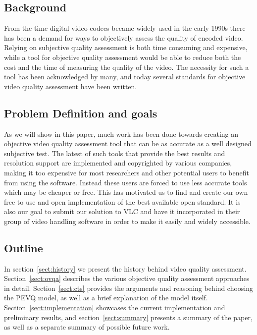 \subsection{Background}\label{sect:background}
From the time digital video codecs became widely used in the early 1990s there has been a demand for ways to objectively assess the quality of encoded video. Relying on subjective quality assessment is both time consuming and expensive, while a tool for objective quality assessment would be able to reduce both the cost and the time of measuring the quality of the video. The necessity for such a tool has been acknowledged by many, and today several standards for objective video quality assessment have been written.


\subsection{Problem Definition and goals}\label{sect:problem}
As we will show in this paper, much work has been done towards creating an objective video quality assessment tool that can be as accurate as a well designed subjective test. The latest of such tools that provide the best results and resolution support are implemented and copyrighted by various companies, making it too expensive for most researchers and other potential users to benefit from using the software. Instead these users are forced to use less accurate tools which may be cheaper or free. This has motivated us to find and create our own free to use and open implementation of the best available open standard. It is also our goal to submit our solution to VLC\cite{vlc} and have it incorporated in their group of video handling software in order to make it easily and widely accessible.


\subsection{Outline}\label{sect:outline}
In section~\ref{sect:history} we present the history behind video quality assessment. Section~\ref{sect:ovqa} describes the various objective quality assessment approaches in detail. Section~\ref{sect:cts} provides the arguments and reasoning behind choosing the PEVQ model, as well as a brief explanation of the model itself. Section~\ref{sect:implementation} showcases the current implementation and preliminary results, and section~\cref{sect:summary} presents a summary of the paper, as well as a separate summary of possible future work.

